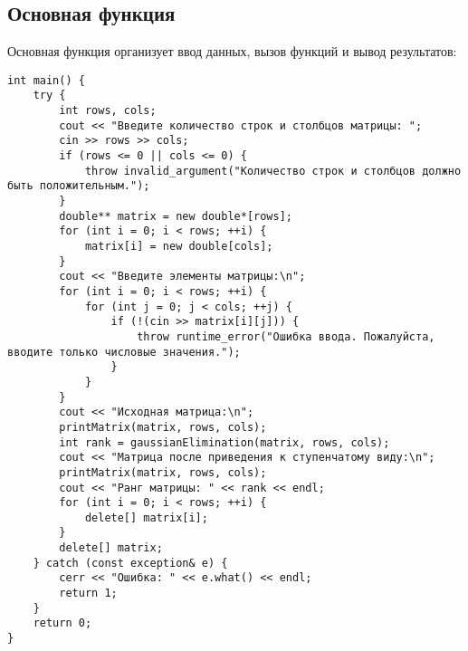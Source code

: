 \documentclass[12pt,a4paper]{scrartcl}
\begin{document}
\subsection*{Основная функция}
Основная функция организует ввод данных, вызов функций и вывод результатов:
\begin{verbatim}
int main() {
    try {
        int rows, cols;
        cout << "Введите количество строк и столбцов матрицы: ";
        cin >> rows >> cols;
        if (rows <= 0 || cols <= 0) {
            throw invalid_argument("Количество строк и столбцов должно быть положительным.");
        }
        double** matrix = new double*[rows];
        for (int i = 0; i < rows; ++i) {
            matrix[i] = new double[cols];
        }
        cout << "Введите элементы матрицы:\n";
        for (int i = 0; i < rows; ++i) {
            for (int j = 0; j < cols; ++j) {
                if (!(cin >> matrix[i][j])) {
                    throw runtime_error("Ошибка ввода. Пожалуйста, вводите только числовые значения.");
                }
            }
        }
        cout << "Исходная матрица:\n";
        printMatrix(matrix, rows, cols);
        int rank = gaussianElimination(matrix, rows, cols);
        cout << "Матрица после приведения к ступенчатому виду:\n";
        printMatrix(matrix, rows, cols);
        cout << "Ранг матрицы: " << rank << endl;
        for (int i = 0; i < rows; ++i) {
            delete[] matrix[i];
        }
        delete[] matrix;
    } catch (const exception& e) {
        cerr << "Ошибка: " << e.what() << endl;
        return 1;
    }
    return 0;
}
\end{verbatim}
\end{document}

